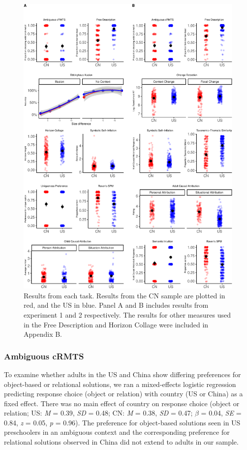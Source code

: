 \documentclass[
  man,floatsintext]{apa6}
\begin{document}
\begin{figure}
\centering
\includegraphics{CCRR_manuscript_files/figure-latex/unnamed-chunk-19-1.pdf}
\caption{\label{fig:unnamed-chunk-19}Results from each task. Results from the CN sample are plotted in red, and the US in blue. Panel A and B includes results from experiment 1 and 2 respectively. The results for other measures used in the Free Description and Horizon Collage were included in Appendix B.}
\end{figure}

\hypertarget{ambiguous-crmts-1}{%
\subsubsection{Ambiguous cRMTS}\label{ambiguous-crmts-1}}

To examine whether adults in the US and China show differing preferences for object-based or relational solutions, we ran a mixed-effects logistic regression predicting response choice (object or relation) with country (US or China) as a fixed effect. There was no main effect of country on response choice (object or relation; US: \emph{M} = 0.39, \emph{SD} = 0.48; CN: \emph{M} = 0.38, \emph{SD} = 0.47; \(\beta\) = 0.04, \emph{SE} = 0.84, \emph{z} = 0.05, \emph{p} = 0.96). The preference for object-based solutions seen in US preschoolers in an ambiguous context and the corresponding preference for relational solutions observed in China did not extend to adults in our sample.
\end{document}
